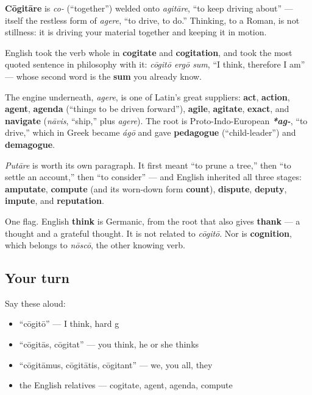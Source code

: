 \begin{cousinweb}
\textbf{Cōgitāre} is \emph{co-} (\textquotedblleft{}together\textquotedblright{}) welded onto \emph{agitāre}, \textquotedblleft{}to keep driving about\textquotedblright{} — itself the restless form of \emph{agere}, \textquotedblleft{}to drive, to do.\textquotedblright{} Thinking, to a Roman, is not stillness: it is driving your material together and keeping it in motion.

English took the verb whole in \textbf{cogitate} and \textbf{cogitation}, and took the most quoted sentence in philosophy with it: \emph{cōgitō ergō sum}, \textquotedblleft{}I think, therefore I am\textquotedblright{} — whose second word is the \textbf{sum} you already know.

The engine underneath, \emph{agere}, is one of Latin's great suppliers: \textbf{act}, \textbf{action}, \textbf{agent}, \textbf{agenda} (\textquotedblleft{}things to be driven forward\textquotedblright{}), \textbf{agile}, \textbf{agitate}, \textbf{exact}, and \textbf{navigate} (\emph{nāvis}, \textquotedblleft{}ship,\textquotedblright{} plus \emph{agere}). The root is Proto-Indo-European \emph{\textbf{*ag-}}, \textquotedblleft{}to drive,\textquotedblright{} which in Greek became \emph{ágō} and gave \textbf{pedagogue} (\textquotedblleft{}child-leader\textquotedblright{}) and \textbf{demagogue}.

\emph{Putāre} is worth its own paragraph. It first meant \textquotedblleft{}to prune a tree,\textquotedblright{} then \textquotedblleft{}to settle an account,\textquotedblright{} then \textquotedblleft{}to consider\textquotedblright{} — and English inherited all three stages: \textbf{amputate}, \textbf{compute} (and its worn-down form \textbf{count}), \textbf{dispute}, \textbf{deputy}, \textbf{impute}, and \textbf{reputation}.

One flag. English \textbf{think} is Germanic, from the root that also gives \textbf{thank} — a thought and a grateful thought. It is not related to \emph{cōgitō}. Nor is \textbf{cognition}, which belongs to \emph{nōscō}, the other knowing verb.
\end{cousinweb}

\subsection*{Your turn}
Say these aloud:

\begin{itemize}
\raggedright
  \item \textquotedblleft{}cōgitō\textquotedblright{} — I think, hard g
  \item \textquotedblleft{}cōgitās, cōgitat\textquotedblright{} — you think, he or she thinks
  \item \textquotedblleft{}cōgitāmus, cōgitātis, cōgitant\textquotedblright{} — we, you all, they
  \item the English relatives — cogitate, agent, agenda, compute
\end{itemize}

